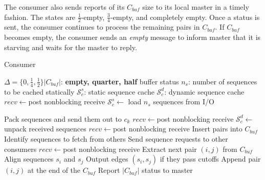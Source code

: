 \documentclass[10pt,journal,letterpaper,compsoc]{IEEEtran}
\begin{document}
The consumer also sends reports of its $C_{buf}$ size to its local master in a timely fashion. The states are $\frac{1}{2}$-empty, $\frac{3}{4}$-empty, and completely empty. Once a status is sent, the consumer continues to process the remaining pairs in $C_{buf}$. 
If $C_{buf}$ becomes empty, the consumer sends an {\it empty} message to inform master that it is starving and waits for the master to reply.  \\



\begin{algorithm}
\caption{Consumer}
\label{cs}
\begin{algorithmic}[1]
    \STATE $\Delta=\{0, \frac{1}{4}, \frac{1}{2}\}|C_{buf}|$: {\bf empty, quarter, half} buffer status
    \STATE $n_{s}$: number of sequences to be cached statically
    \STATE $\mathcal{S}_{c}^{s}$: static sequence cache
    \STATE $ \mathcal{S}_{c}^{d}$: dynamic sequence cache
    \STATE $recv\leftarrow$post nonblocking receive
    \STATE $\mathcal{S}_{c}^{s}\leftarrow$ load $n_{s}$ sequences from I/O
    
    \WHILE {\TRUE}
			\STATE Pack sequences and send them out to $c_{k}$
			\STATE $recv\leftarrow$post nonblocking receive
			\STATE  $\mathcal{S}_{c}^{d}\leftarrow$ unpack received sequences
			\STATE $recv\leftarrow$post nonblocking receive
		        \STATE Insert pairs into $C_{buf}$
			\STATE Identify sequences to fetch from others
			\STATE Send sequence requests to other consumers
			\STATE $recv\leftarrow$post nonblocking receive
	        \ENDIF
	    \ELSE
	    		\STATE Extract next pair $(i, j)$ from $C_{buf}$
				\STATE Align sequences $s_{i}$ and $s_{j}$
				\STATE Output edges $(s_{i},s_{j})$ if they pass cutoffs
			\ELSE
				\STATE Append pair $(i, j)$ at the end of the $C_{buf}$
			\ENDIF
				\STATE Report $|C_{buf}|$ status to master
			\ENDIF
		\ENDIF
            \ENDIF
    \ENDWHILE
\end{algorithmic}
\end{algorithm}
\end{document}

